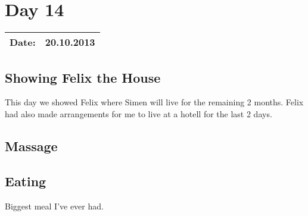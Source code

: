\section{Day 14}
\begin{tabular}{|c|c|}
\hline
Date: & 20.10.2013 \\
\hline
\end{tabular}
\subsection{Showing Felix the House}
This day we showed Felix where Simen will live for the remaining 2 months.
Felix had also made arrangements for me to live at a hotell for the last 2 days.
\subsection{Massage}
\subsection{Eating}
Biggest meal I've ever had. 
